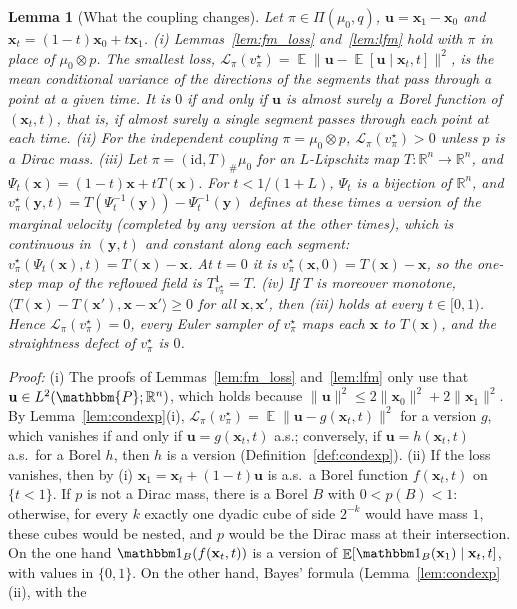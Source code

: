 \documentclass{article}
\DeclareMathOperator{\E}{\mathbb{E}}
\newcommand{\RR}{\mathbb{R}}
\newcommand{\PP}{\mathbbm{P}}
\newcommand{\cL}{\mathcal{L}}
\newcommand{\bx}{\mathbf{x}}
\newcommand{\by}{\mathbf{y}}
\newcommand{\bu}{\mathbf{u}}
\newcommand{\vstar}{v^{\star}}
\theoremstyle{plain}
\newtheorem{lemma}[theorem]{Lemma}
\theoremstyle{remark}
\begin{document}
\begin{lemma}[What the coupling changes]\label{lem:reflow}
Let $\pi\in\Pi(\mu_0,q)$, $\bu=\bx_1-\bx_0$ and $\bx_t=(1-t)\bx_0+t\bx_1$.
(i) Lemmas~\ref{lem:fm_loss} and~\ref{lem:lfm} hold with $\pi$ in place of $\mu_0\otimes p$. The smallest loss,
$\cL_\pi(\vstar_\pi)=\E\|\bu-\E[\bu\mid\bx_t,t]\|^2$, is the mean conditional variance of the directions of the segments that pass through
a point at a given time. It is $0$ if and only if $\bu$ is almost surely a Borel function of $(\bx_t,t)$, that is, if almost
surely a single segment passes through each point at each time.
(ii) For the independent coupling $\pi=\mu_0\otimes p$, $\cL_\pi(\vstar_\pi)>0$ unless $p$ is a Dirac mass.
(iii) Let $\pi=(\mathrm{id},T)_\#\mu_0$ for an $L$-Lipschitz map $T:\RR^n\to\RR^n$, and $\Psi_t(\bx)=(1-t)\bx+tT(\bx)$. For $t<1/(1+L)$, $\Psi_t$ is a
bijection of $\RR^n$, and $\vstar_\pi(\by,t)=T(\Psi_t^{-1}(\by))-\Psi_t^{-1}(\by)$ defines at these times a version of the marginal velocity
(completed by any version at the other times), which is continuous in $(\by,t)$ and constant along each segment:
$\vstar_\pi(\Psi_t(\bx),t)=T(\bx)-\bx$. At $t=0$ it is $\vstar_\pi(\bx,0)=T(\bx)-\bx$,
so the one-step map of the reflowed field is $T^1_{\vstar_\pi}=T$.
(iv) If $T$ is moreover \emph{monotone}, $\langle T(\bx)-T(\bx'),\bx-\bx'\rangle\ge0$ for all $\bx,\bx'$, then (iii) holds at every $t\in[0,1)$. Hence
$\cL_\pi(\vstar_\pi)=0$, every Euler sampler of $\vstar_\pi$ maps each $\bx$ to $T(\bx)$, and the straightness defect of $\vstar_\pi$ is $0$.
\end{lemma}
\textit{Proof:}
(i) The proofs of Lemmas~\ref{lem:fm_loss} and~\ref{lem:lfm} only use that $\bu\in L^2(\PP;\RR^n)$, which holds because
$\|\bu\|^2\le2\|\bx_0\|^2+2\|\bx_1\|^2$. By Lemma~\ref{lem:condexp}(i), $\cL_\pi(\vstar_\pi)=\E\|\bu-g(\bx_t,t)\|^2$ for a version $g$, which vanishes if and only if
$\bu=g(\bx_t,t)$ a.s.; conversely, if $\bu=h(\bx_t,t)$ a.s.\ for a Borel $h$, then $h$ is a version (Definition~\ref{def:condexp}).
(ii) If the loss vanishes, then by (i) $\bx_1=\bx_t+(1-t)\bu$ is a.s.\ a Borel function $f(\bx_t,t)$ on $\{t<1\}$. If $p$ is not a Dirac mass,
there is a Borel $B$ with $0<p(B)<1$: otherwise, for every $k$ exactly one dyadic cube of side $2^{-k}$ would have mass $1$, these
cubes would be nested, and $p$ would be the Dirac mass at their intersection. On the one hand $\mathbbm 1_B(f(\bx_t,t))$ is a version
of $\E[\mathbbm 1_B(\bx_1)\mid\bx_t,t]$, with values in $\{0,1\}$. On the other hand, Bayes' formula (Lemma~\ref{lem:condexp}(ii), with the
\end{document}

